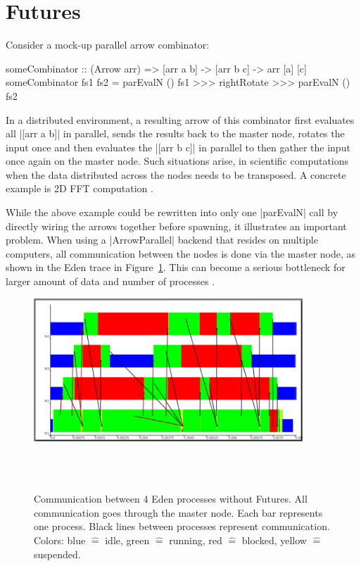\section{Futures} \label{sec:futures}
Consider a mock-up parallel arrow combinator:
\begin{code}
someCombinator :: (Arrow arr) => [arr a b] -> [arr b c] -> arr [a] [c]
someCombinator fs1 fs2 = parEvalN () fs1 >>> rightRotate >>> parEvalN () fs2
\end{code}

In a distributed environment, a resulting arrow of this combinator first evaluates all |[arr a b]| in parallel, sends the results back to the master node, rotates the input once and then evaluates the |[arr b c]| in parallel to then gather the input once again on the master node.
Such situations arise, \eg in scientific computations when the data distributed across the nodes needs to be transposed. A concrete example is 2D FFT computation \cite{Gorlatch,Berthold2009-fft}.

While the above example could be rewritten into only one |parEvalN| call by directly wiring the arrows together before spawning, it illustrates an important problem. When using a |ArrowParallel| backend that resides on multiple computers, all communication between the nodes is done via the master node, as shown in the Eden trace in Figure~\ref{fig:withoutFutures}. This can become a serious bottleneck %
for larger amount of data and number of processes \citep[as \eg][showcases]{Berthold2009-fft}.
\begin{figure}[ht]
	\centering
	\includegraphics[width=0.9\textwidth]{images/withoutFutures}
	\caption[without Futures]{Communication between 4 Eden processes without Futures. All communication goes through the master node. Each bar represents one process. Black lines between processes represent communication. Colors: blue $\hat{=}$ idle, green $\hat{=}$ running, red  $\hat{=}$ blocked, yellow $\hat{=}$ suspended.}
	\label{fig:withoutFutures}
\\
\\
\end{figure}

